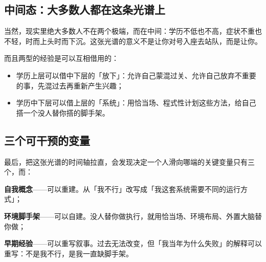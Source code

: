\subsection{中间态：大多数人都在这条光谱上}

当然，现实里绝大多数人不在两个极端，而在中间：学历不低也不高，症状不重也不轻，时而上头时而下沉。这张光谱的意义不是让你对号入座去站队，而是让你。

而且两型的经验是可以互相借用的：

\begin{itemize}
  \item 学历上层可以借中下层的「放下」：允许自己蒙混过关、允许自己放弃不重要的事，先混过去再重新产生兴趣；
  \item 学历中下层可以借上层的「系统」：用恰当场、程式性计划这些方法，给自己搭一个没人替你搭的脚手架。
\end{itemize}

\subsection{三个可干预的变量}

最后，把这张光谱的时间轴拉直，会发现决定一个人滑向哪端的关键变量只有三个，而：

\begin{checklist}
  \item \textbf{自我概念}——可以重建。从「我不行」改写成「我这套系统需要不同的运行方式」；
  \item \textbf{环境脚手架}——可以自建。没人替你做执行，就用恰当场、环境布局、外置大脑替你做；
  \item \textbf{早期经验}——可以重写叙事。过去无法改变，但「我当年为什么失败」的解释可以重写：不是我不行，是我一直缺脚手架。
\end{checklist}

